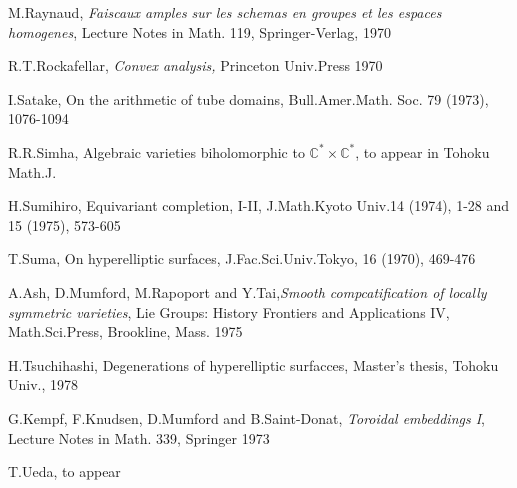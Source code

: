 \begin{thebibliography}{99}
 {M.Raynaud,} \textit{Faiscaux amples sur les schemas en
  groupes et les espaces homogenes}, Lecture Notes in Math. 119,
  Springer-Verlag, 1970

 {R.T.Rockafellar,} \textit{Convex analysis,} Princeton
  Univ.Press 1970

 {I.Satake,} On the arithmetic of tube domains,
  Bull.Amer.Math. Soc. 79 (1973), 1076-1094

 {R.R.Simha,} Algebraic varieties biholomorphic to
  $\mathbb{C}^* \times \mathbb{C}^*$, to appear in Tohoku Math.J.

 {H.Sumihiro,} Equivariant completion, I-II, J.Math.Kyoto
  Univ.14 (1974), 1-28 and 15 (1975), 573-605

 {T.Suma,} On hyperelliptic surfaces, J.Fac.Sci.Univ.Tokyo,
  16 (1970), 469-476

 {A.Ash,} D.Mumford, M.Rapoport and Y.Tai,\textit{Smooth
  compcatification of locally symmetric varieties}, Lie Groups: History
  Frontiers and Applications IV, Math.Sci.Press, Brookline, Mass. 1975  

 {H.Tsuchihashi,} Degenerations of hyperelliptic surfacces,
  Master's thesis, Tohoku Univ., 1978

 {G.Kempf,} F.Knudsen, D.Mumford and B.Saint-Donat,
  \textit{Toroidal embeddings I}, Lecture Notes in Math. 339,
  Springer 1973 

 {T.Ueda,} to appear
\end{thebibliography}

